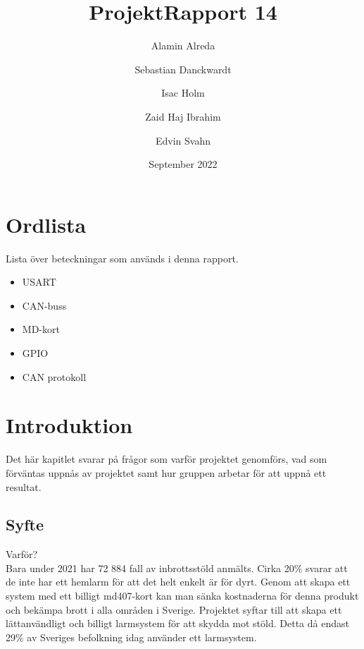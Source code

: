 \documentclass{article}
\title{ProjektRapport 14}
\author{Alamin Alreda \and Sebastian Danckwardt \and Isac Holm \and Zaid Haj Ibrahim   \and Edvin Svahn}
\date{September 2022}
\begin{document}
\maketitle

\section*{Ordlista}
Lista över beteckningar som används i denna rapport.
\begin{itemize}
    \item USART
    \item CAN-buss
    \item MD-kort
    \item GPIO
    \item CAN protokoll
    
\end{itemize}
 
\section{Introduktion}
Det här kapitlet svarar på frågor som varför projektet genomförs,
vad som förväntas uppnås av projektet samt hur gruppen arbetar för att uppnå ett resultat.
\subsection{Syfte}
Varför?
\\
Bara under 2021 har 72 884 fall av inbrottsstöld anmälts\cite{BRa}. 
Cirka 20\% svarar att de inte har ett hemlarm för att det helt enkelt är för dyrt\cite{MoFor}.
Genom att skapa ett system med ett billigt md407-kort kan man sänka kostnaderna för denna produkt och bekämpa brott i alla områden i Sverige. 
Projektet syftar till att skapa ett lättanvändligt och billigt larmsystem för att skydda mot stöld. 
Detta då endast 29\% av Sveriges befolkning idag använder ett larmsystem\cite{SSF}.
\end{document}

